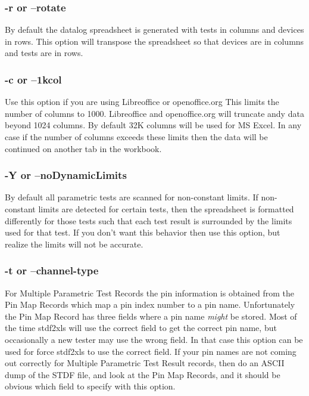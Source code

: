 \documentclass[letterpaper]{article}
\begin{document}
\subsubsection{\bf -r or --rotate}
By default the datalog spreadsheet is generated with tests in columns and devices in rows.  This
option will transpose the spreadsheet so that devices are in columns and tests are in rows.

\subsubsection{\bf -c or --1kcol}
Use this option if you are using Libreoffice or openoffice.org  This limits the number
of columns to 1000.  Libreoffice and openoffice.org will truncate andy data beyond 1024 columns.
By default 32K columns will be used for MS Excel.  In any case if the number of columns
exceeds these limits then the data will be continued on another tab in the workbook.

\subsubsection{\bf -Y or --noDynamicLimits}
By default all parametric tests are scanned for non-constant limits.  If non-constant
limits are detected for certain tests, then the spreadsheet is formatted differently
for those tests such that each test result is surrounded by the limits used for that
test.  If you don't want this behavior then use this option, but realize the limits
will not be accurate.

\subsubsection{\bf -t or --channel-type}
For Multiple Parametric Test Records the pin information is obtained from
the Pin Map Records which map a pin index number to a pin name.  Unfortunately
the Pin Map Record has three fields where a pin name {\it might} be stored.
Most of the time stdf2xls will use the correct field to get the correct
pin name, but occasionally a new tester may use the wrong field.  In that
case this option can be used for force stdf2xls to use the correct field.
If your pin names are not coming out correctly for Multiple Parametric Test Result
records, then do an ASCII dump of the STDF file, and look at the Pin Map Records,
and it should be obvious which field to specify with this option.
\end{document}
